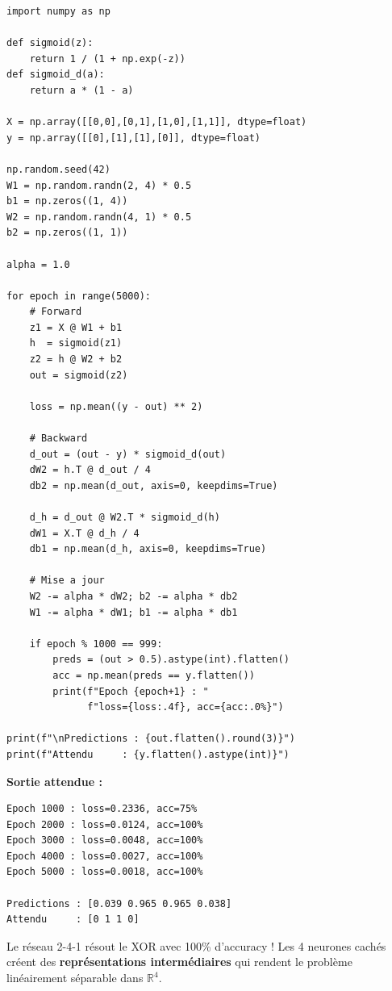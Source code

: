 \begin{pythonbox}
\begin{lstlisting}
import numpy as np

def sigmoid(z):
    return 1 / (1 + np.exp(-z))
def sigmoid_d(a):
    return a * (1 - a)

X = np.array([[0,0],[0,1],[1,0],[1,1]], dtype=float)
y = np.array([[0],[1],[1],[0]], dtype=float)

np.random.seed(42)
W1 = np.random.randn(2, 4) * 0.5
b1 = np.zeros((1, 4))
W2 = np.random.randn(4, 1) * 0.5
b2 = np.zeros((1, 1))

alpha = 1.0

for epoch in range(5000):
    # Forward
    z1 = X @ W1 + b1
    h  = sigmoid(z1)
    z2 = h @ W2 + b2
    out = sigmoid(z2)

    loss = np.mean((y - out) ** 2)

    # Backward
    d_out = (out - y) * sigmoid_d(out)
    dW2 = h.T @ d_out / 4
    db2 = np.mean(d_out, axis=0, keepdims=True)

    d_h = d_out @ W2.T * sigmoid_d(h)
    dW1 = X.T @ d_h / 4
    db1 = np.mean(d_h, axis=0, keepdims=True)

    # Mise a jour
    W2 -= alpha * dW2; b2 -= alpha * db2
    W1 -= alpha * dW1; b1 -= alpha * db1

    if epoch % 1000 == 999:
        preds = (out > 0.5).astype(int).flatten()
        acc = np.mean(preds == y.flatten())
        print(f"Epoch {epoch+1} : "
              f"loss={loss:.4f}, acc={acc:.0%}")

print(f"\nPredictions : {out.flatten().round(3)}")
print(f"Attendu     : {y.flatten().astype(int)}")
\end{lstlisting}
\end{pythonbox}

\textbf{Sortie attendue :}
\begin{verbatim}
Epoch 1000 : loss=0.2336, acc=75%
Epoch 2000 : loss=0.0124, acc=100%
Epoch 3000 : loss=0.0048, acc=100%
Epoch 4000 : loss=0.0027, acc=100%
Epoch 5000 : loss=0.0018, acc=100%

Predictions : [0.039 0.965 0.965 0.038]
Attendu     : [0 1 1 0]
\end{verbatim}

\begin{retenirbox}
    Le r\'{e}seau 2-4-1 r\'{e}sout le XOR avec 100\% d'accuracy !
    Les 4 neurones cach\'{e}s cr\'{e}ent des \textbf{repr\'{e}sentations interm\'{e}diaires}
    qui rendent le probl\`{e}me lin\'{e}airement s\'{e}parable dans $\mathbb{R}^4$.
\end{retenirbox}

